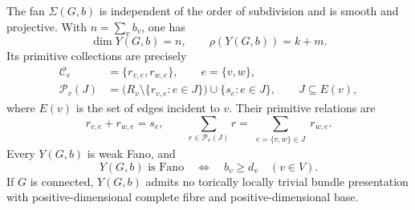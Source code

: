 \begin{proposition}\label{mixed:geometry}
The fan $\Sigma(G,b)$ is independent of the order of subdivision and is
smooth and projective. With $n=\sum_v b_v$, one has
\begin{equation}\label{mixed:dimension}
 \dim Y(G,b)=n,\qquad \rho(Y(G,b))=k+m.
\end{equation}
Its primitive collections are precisely
\begin{align}
 \mathcal C_e&=\{r_{v,e},r_{w,e}\},\qquad e=\{v,w\},
 \label{mixed:edge-collection}\\
 \mathcal P_v(J)&=
 \bigl(R_v\setminus\{r_{v,e}:e\in J\}\bigr)
 \cup\{s_e:e\in J\},\qquad J\subseteq E(v),
 \label{mixed:vertex-collection}
\end{align}
where $E(v)$ is the set of edges incident to $v$. Their primitive relations
are
\begin{equation}\label{mixed:primitive-relations}
 r_{v,e}+r_{w,e}=s_e,\qquad
 \sum_{r\in\mathcal P_v(J)}r
   =\sum_{\substack{e=\{v,w\}\in J}}r_{w,e}.
\end{equation}
Every $Y(G,b)$ is weak Fano, and
\begin{equation}\label{mixed:fano}
 Y(G,b)\text{ is Fano}
 \quad\Longleftrightarrow\quad b_v\ge d_v\quad(v\in V).
\end{equation}
If $G$ is connected, $Y(G,b)$ admits no torically locally trivial bundle
presentation with positive-dimensional complete fibre and
positive-dimensional base.
\end{proposition}

